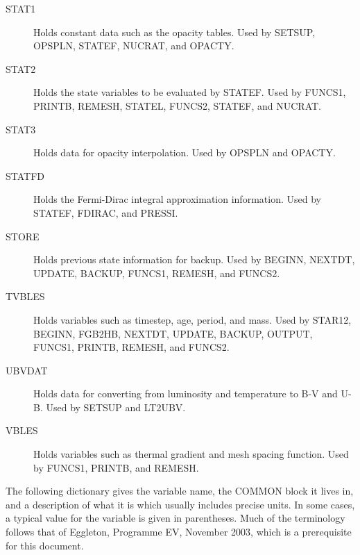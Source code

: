 \documentclass{article}
\begin{document}
\begin{description}
\item[STAT1] Holds constant data such as the opacity tables.
    Used by SETSUP, OPSPLN, STATEF, NUCRAT, and OPACTY.

\item[STAT2] Holds the state variables to be evaluated by STATEF.
    Used by FUNCS1, PRINTB, REMESH, STATEL, FUNCS2, STATEF, and NUCRAT.

\item[STAT3] Holds data for opacity interpolation.
    Used by OPSPLN and OPACTY.

\item[STATFD] Holds the Fermi-Dirac integral approximation information.
    Used by STATEF, FDIRAC, and PRESSI.

\item[STORE] Holds previous state information for backup.
    Used by BEGINN, NEXTDT, UPDATE, BACKUP, FUNCS1, REMESH, and FUNCS2.

\item[TVBLES] Holds variables such as timestep, age, period, and mass.
    Used by STAR12, BEGINN, FGB2HB, NEXTDT, UPDATE, BACKUP, OUTPUT,
			FUNCS1, PRINTB, REMESH, and FUNCS2.

\item[UBVDAT] Holds data for converting from luminosity and temperature to B-V and U-B.
    Used by SETSUP and LT2UBV.

\item[VBLES] Holds variables such as thermal gradient and mesh spacing function.
    Used by FUNCS1, PRINTB, and REMESH.
\end{description}

The following dictionary gives the variable name, the COMMON block it lives in,
and a description of what it is which usually includes precise units.  In some cases,
a typical value for the variable is given in parentheses.  Much of the terminology follows
 that of Eggleton, Programme EV, November 2003, which is a prerequisite for this document.
\end{document}
